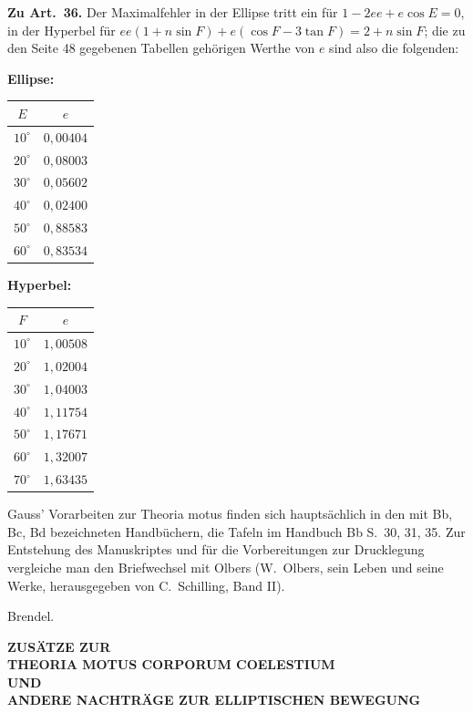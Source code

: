 \documentclass[11pt,a4paper]{article}
\begin{document}
\vspace{0.5em}
\noindent\textbf{Zu Art.~36.} Der Maximalfehler in der Ellipse tritt ein für $1 - 2ee + e\cos E = 0$, in der Hyperbel für $ee(1 + n\sin F) + e(\cos F - 3\tan F) = 2 + n\sin F$; die zu den Seite 48 gegebenen Tabellen gehörigen Werthe von $e$ sind also die folgenden:

\begin{center}
\textbf{Ellipse:}
\begin{tabular}{c|c}
$E$ & $e$ \\
\midrule
$10^\circ$ & $0{,}00404$ \\
$20^\circ$ & $0{,}08003$ \\
$30^\circ$ & $0{,}05602$ \\
$40^\circ$ & $0{,}02400$ \\
$50^\circ$ & $0{,}88583$ \\
$60^\circ$ & $0{,}83534$
\end{tabular}
\qquad
\textbf{Hyperbel:}
\begin{tabular}{c|c}
$F$ & $e$ \\
\midrule
$10^\circ$ & $1{,}00508$ \\
$20^\circ$ & $1{,}02004$ \\
$30^\circ$ & $1{,}04003$ \\
$40^\circ$ & $1{,}11754$ \\
$50^\circ$ & $1{,}17671$ \\
$60^\circ$ & $1{,}32007$ \\
$70^\circ$ & $1{,}63435$
\end{tabular}
\end{center}

\newpage
\setcounter{page}{265}

Gauss' Vorarbeiten zur Theoria motus finden sich hauptsächlich in den mit Bb, Bc, Bd bezeichneten Handbüchern, die Tafeln im Handbuch Bb S.\ 30, 31, 35. Zur Entstehung des Manuskriptes und für die Vorbereitungen zur Drucklegung vergleiche man den Briefwechsel mit Olbers (W.\ Olbers, sein Leben und seine Werke, herausgegeben von C.\ Schilling, Band II).

\begin{flushright}
Brendel.
\end{flushright}

\newpage
\setcounter{page}{266}

\begin{center}
\Large\bfseries\foreignlanguage{ngerman}{ZUSÄTZE ZUR}\\[0.3em]
\Large\bfseries\foreignlanguage{ngerman}{THEORIA MOTUS CORPORUM COELESTIUM}\\[0.5em]
\Large\bfseries\foreignlanguage{ngerman}{UND}\\[0.3em]
\Large\bfseries\foreignlanguage{ngerman}{ANDERE NACHTRÄGE ZUR ELLIPTISCHEN BEWEGUNG}
\end{center}
\end{document}
